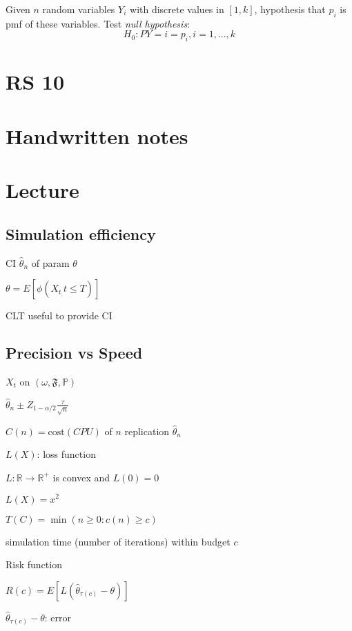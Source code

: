 \documentclass{article}
\begin{document}
Given $n$ random variables $Y_i$ with discrete values in $[1, k]$,
hypothesis that $p_i$ is pmf of these variables. Test \emph{null
hypothesis}: \[H_0 : P{Y = i} = p_i, i = 1,\ldots,k\]



\section{RS 10}

\section*{Handwritten notes}

\section*{Lecture}

\subsection{Simulation efficiency}

CI $\hat\theta_n$ of param $\theta$

$\theta = E[\phi(X_t_; t \le T)]$

CLT useful to provide CI

\subsection{Precision vs Speed}

$X_t$ on $(\omega, \mathfrak F, \mathbb P)$

$\hat\theta_n \pm Z_{1 - \alpha/2} \frac{\tau}{\sqrt{n}}$

$C(n) = \text{cost}(CPU)$ of $n$ replication $\hat\theta_n$

$L(X)$: loss function

$L:\mathbb R \to \mathbb R ^ +$ is convex and $L(0) = 0$

$L(X) = x^2$

$T(C) = \min(n \ge 0 : c(n) \ge c)$

simulation time (number of iterations) within budget $c$

\begin{definition} Risk function

    $R(c) = E[L(\hat\theta_{\tau(c)} - \theta)]$

    $\hat\theta_{\tau(c)} - \theta$: error

\end{definition}
\end{document}
